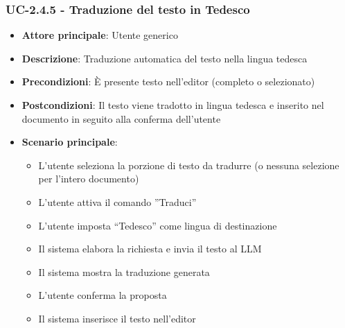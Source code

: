 \documentclass[11pt,a4paper]{article}
\begin{document}
\subsubsection{UC-2.4.5 - Traduzione del testo in Tedesco}
\begin{itemize}
    \item \textbf{Attore principale}: Utente generico
    \item \textbf{Descrizione}: Traduzione automatica del testo nella lingua tedesca
    \item \textbf{Precondizioni}: È presente testo nell’editor (completo o selezionato)
    \item \textbf{Postcondizioni}: Il testo viene tradotto in lingua tedesca e inserito nel documento in seguito alla conferma dell'utente
    \item \textbf{Scenario principale}:
    \begin{itemize}
        \item L’utente seleziona la porzione di testo da tradurre (o nessuna selezione per l'intero documento)
        \item L’utente attiva il comando ”Traduci”
        \item L’utente imposta “Tedesco” come lingua di destinazione
        \item Il sistema elabora la richiesta e invia il testo al LLM
        \item Il sistema mostra la traduzione generata
        \item L'utente conferma la proposta
        \item Il sistema inserisce il testo nell'editor
    \end{itemize}
\end{itemize}
\end{document}
